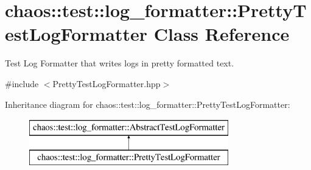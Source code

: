 \hypertarget{classchaos_1_1test_1_1log__formatter_1_1_pretty_test_log_formatter}{\section{chaos\-:\-:test\-:\-:log\-\_\-formatter\-:\-:Pretty\-Test\-Log\-Formatter Class Reference}
\label{classchaos_1_1test_1_1log__formatter_1_1_pretty_test_log_formatter}
}


Test Log Formatter that writes logs in pretty formatted text.  




{\ttfamily \#include $<$Pretty\-Test\-Log\-Formatter.\-hpp$>$}

Inheritance diagram for chaos\-:\-:test\-:\-:log\-\_\-formatter\-:\-:Pretty\-Test\-Log\-Formatter\-:\begin{figure}[H]
\begin{center}
\leavevmode
\includegraphics[height=2.000000cm]{classchaos_1_1test_1_1log__formatter_1_1_pretty_test_log_formatter}
\end{center}
\end{figure}
